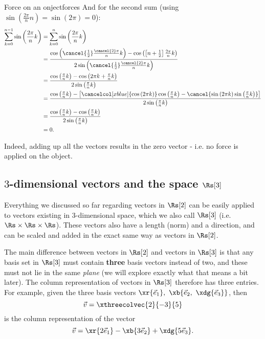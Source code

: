 \begin{example}{Force on an onject}{forces}
  And for the second sum (using $\sin\left(\frac{2\pi}{n}n\right)=\sin\left(2\pi\right)=0$):
  \begin{align*}
    \sum\limits_{k=0}^{n-1}\sin\left( \frac{2\pi}{n}k \right) &= \sum\limits_{k=0}^{n}\sin\left( \frac{2\pi}{n}k \right)\\
                                                              &= \frac{\cos\left(\cancel{\frac{1}{2}}\frac{\cancel{2}\pi}{n}k\right)-\cos\left(\left[n+\frac{1}{2}\right]\frac{2\pi}{n}k\right)}{2\sin\left(\cancel{\frac{1}{2}}\frac{\cancel{2}\pi}{n}k\right)}\\
                                                              &= \frac{\cos\left(\frac{\pi}{n}k\right)-\cos\left(2\pi k+\frac{\pi}{n}k\right)}{2\sin\left(\frac{\pi}{n}k\right)}\\
                                                              &= \frac{\cos\left(\frac{\pi}{n}k\right)-\left[\cancelcol[xblue]{\cos\left(2\pi k\right)}\cos\left(\frac{\pi}{n}k\right)-\cancel{\sin\left(2\pi k\right)\sin\left(\frac{\pi}{n}k\right)}\right]}{2\sin\left(\frac{\pi}{n}k\right)}\\
                                                              &= \frac{\cos\left(\frac{\pi}{n}k\right)-\cos\left(\frac{\pi}{n}k\right)}{2\sin\left(\frac{\pi}{n}k\right)}\\
                                                              &= 0.
  \end{align*}


  Indeed, adding up all the vectors results in the zero vector - i.e. no force is applied on the object.
\end{example}

\subsection{$3$-dimensional vectors and the space $\Rs[3]$}
Everything we discussed so far regarding vectors in $\Rs[2]$ can be easily applied to vectors existing in 3-dimensional space, which we also call $\Rs[3]$ (i.e. $\Rs\times\Rs\times\Rs$). These vectors also have a length (norm) and a direction, and can be scaled and added in the exact same way as vectors in $\Rs[2]$.

The main difference between vectors in $\Rs[2]$ and vectors in $\Rs[3]$ is that any basis set in $\Rs[3]$ must contain \textbf{three} basis vectors instead of two, and these must not lie in the same \textit{plane} (we will explore exactly what that means a bit later). The column representation of vectors in $\Rs[3]$ therefore has three entries. For example, given the three basis vectors $\xr{\vec{e}_{1}},\ \xb{\vec{e}_{2},\ \xdg{\vec{e}_{3}}}$, then
\[
  \vec{v} = \xthreecolvec{2}{-3}{5}
\]
is the column representation of the vector
\[
  \vec{v} = \xr{2\vec{e}_{1}} - \xb{3\vec{e}_{2}} + \xdg{5\vec{e}_{3}}.
\]

